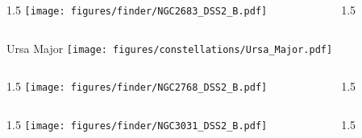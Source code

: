 \documentclass[final]{beamer}
\newlength{\colwidth}
\begin{document}

\begin{frame}[t]{}
  \begin{columns}[T]
    \begin{column}{1.5\colwidth}
      \centering
      \texttt{[image: figures/finder/NGC2683\_DSS2\_B.pdf]}
    \end{column}
    \begin{column}{1.5\colwidth}
      \Large
      
    \end{column}
  \end{columns}
  \vspace{\fill}
\end{frame}


\begin{frame}[t]{\LARGE Ursa Major}
  \centering
  \texttt{[image: figures/constellations/Ursa\_Major.pdf]}
\end{frame}


\begin{frame}[t]{}
  \begin{columns}[T]
    \begin{column}{1.5\colwidth}
      \centering
      \texttt{[image: figures/finder/NGC2768\_DSS2\_B.pdf]}
    \end{column}
    \begin{column}{1.5\colwidth}
      \Large
      
    \end{column}
  \end{columns}
  \vspace{\fill}
  \begin{columns}[T]
    \begin{column}{1.5\colwidth}
      \centering
      \texttt{[image: figures/finder/NGC3031\_DSS2\_B.pdf]}
    \end{column}
    \begin{column}{1.5\colwidth}
      \Large
      
    \end{column}
  \end{columns}
\end{frame}
\end{document}
